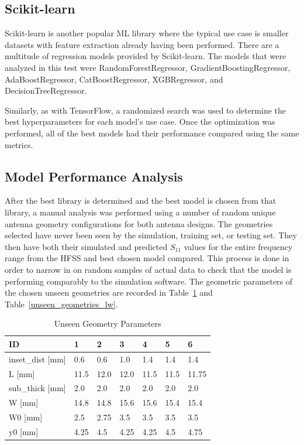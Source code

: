 \documentclass[conference]{IEEEtran}
\begin{document}
\subsection{Scikit-learn}
Scikit-learn is another popular ML library where the typical use case is smaller datasets with feature extraction already having been performed. There are a multitude of regression models provided by Scikit-learn. The models that were analyzed in this test were RandomForestRegressor, GradientBoostingRegressor, AdaBoostRegressor, CatBoostRegressor, XGBRegressor, and DecisionTreeRegressor.

Similarly, as with TensorFlow, a randomized search was used to determine the best hyperparameters for each model's use case. Once the optimization was performed, all of the best models had their performance compared using the same metrics. 

\subsection{Model Performance Analysis}
After the best library is determined and the best model is chosen from that library, a manual analysis was performed using a number of random unique antenna geometry configurations for both antenna designs. The geometries selected have never been seen by the simulation, training set, or testing set. They then have both their simulated and predicted $S_{11}$ values for the entire frequency range from the HFSS and best chosen model compared. This process is done in order to narrow in on random samples of actual data to check that the model is performing comparably to the simulation software. The geometric parameters of the chosen unseen geometries are recorded in Table~\ref{unseen_geometries_p} and Table~\ref{unseen_geometries_lw}.

\begin{table}[h]
\caption{Unseen Geometry Parameters}
\begin{center}
\begin{tabular}{ |l|l|l|l|l|l|l| }
    \hline
    ID & 1 & 2 & 3 & 4 & 5 & 6 \\ 
    \hline
    inset\_dist [mm] & 0.6 & 0.6 & 1.0 & 1.4 & 1.4 & 1.4 \\
    \hline
    L [mm] & 11.5 & 12.0 & 12.0 & 11.5 & 11.5 & 11.75 \\
    \hline
    sub\_thick [mm]  & 2.0 & 2.0 & 2.0 & 2.0 & 2.0 & 2.0 \\
    \hline
    W [mm]  & 14.8 & 14.8 & 15.6 & 15.6 & 15.4 & 15.4 \\
    \hline
    W0 [mm] & 2.5 & 2.75 & 3.5 & 3.5 & 3.5 & 3.5 \\
    \hline
    y0 [mm] & 4.25 & 4.5 & 4.25 & 4.25 & 4.5 & 4.75 \\
    \hline
\end{tabular}
\end{center}
\label{unseen_geometries_p}
\end{table}    
\end{document}
